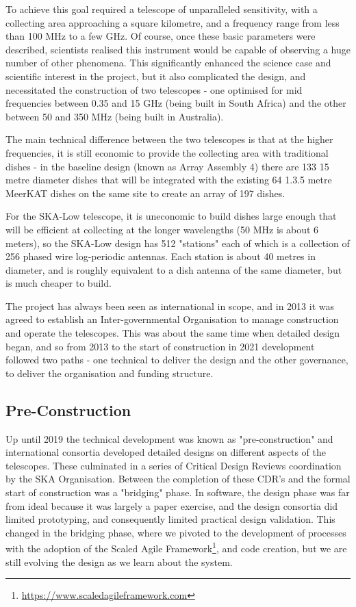 \documentclass[a4paper,
               biblatex,     %
               keeplastbox,   %
               ]{jacow}
\begin{document}
To achieve this goal required a telescope of unparalleled sensitivity, with a collecting area approaching a square kilometre, and a frequency range from less than 100 MHz to a few GHz. Of course, once these basic parameters were described, scientists realised this instrument would be capable of observing a huge number of other phenomena. This significantly enhanced the science case and scientific interest in the project, but it also complicated the design, and necessitated the construction of two telescopes - one optimised for mid frequencies between 0.35 and 15 GHz (being built in South Africa) and the other between 50 and 350 MHz (being built in Australia). 

The main technical difference between the two telescopes is that at the higher frequencies, it is still economic to provide the collecting area with traditional dishes - in the baseline design (known as Array Assembly 4) there are 133 15 metre diameter dishes that will be integrated with the existing 64 1.3.5 metre MeerKAT dishes on the same site to create an array of 197 dishes.

For the SKA-Low telescope, it is uneconomic to build dishes large enough that will be efficient at collecting at the longer wavelengths (50 MHz is about 6 meters), so the SKA-Low design has 512 "stations" each of which is a collection of 256 phased wire log-periodic antennas. Each station is about 40 metres in diameter, and is roughly equivalent to a dish antenna of the same diameter, but is much cheaper to build.

The project has always been seen as international in scope, and in 2013 it was agreed to establish an Inter-governmental Organisation to manage construction and operate the telescopes. This was about the same time when detailed design began, and so from 2013 to the start of construction in 2021 development followed two paths - one technical to deliver the design and the other governance, to deliver the organisation and funding structure.

\subsection{Pre-Construction}
Up until 2019 the technical development was known as "pre-construction" and international consortia developed detailed designs on different aspects of the telescopes. These culminated in a series of Critical Design Reviews coordination by the SKA Organisation. Between the completion of these CDR's and the formal start of construction was a "bridging" phase. In software, the design phase was far from ideal because it was largely a paper exercise, and the design consortia did limited prototyping, and consequently limited practical design validation. This changed in the bridging phase, where we pivoted to the development of processes with the adoption of the Scaled Agile Framework\footnote{\url{https://www.scaledagileframework.com}}, and code creation, but we are still evolving the design as we learn about the system.
\end{document}
